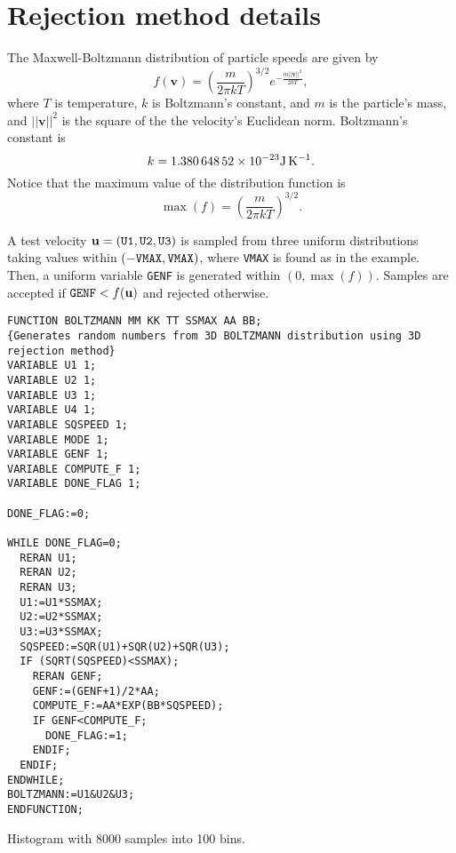 \documentclass[12pt]{article}
\begin{document}
\section*{Rejection method details}

The Maxwell-Boltzmann distribution of particle speeds are given by
\[f(\mathbf{v})=\left( \frac{m}{2\pi k T} \right)^{3/2} e^{-\frac{m||\mathbf{v}||^2}{2kT}},\]
where $T$ is temperature, $k$ is Boltzmann's constant, and $m$ is the particle's mass, and $||\mathbf{v}||^2$ is the square of the the velocity's Euclidean norm.  Boltzmann's constant is
\[k=\text{\num[exponent-product = \times]{1.38064852e-23}\SI{}{\joule\per\kelvin}}.\]
Notice that the maximum value of the distribution function is 
\[\max(f)=\left( \frac{m}{2\pi k T} \right)^{3/2}.\]

A test velocity $\mathbf{u}=(\text{\texttt{U1}},\text{\texttt{U2}},\text{\texttt{U3}})$ is sampled from three uniform distributions taking values within $(-\text{\texttt{VMAX}},\text{\texttt{VMAX}})$, where \texttt{VMAX} is found as in the example.  Then, a uniform variable \texttt{GENF} is generated within $(0,\max(f))$.  Samples are accepted if $\text{\texttt{GENF}}<f(\mathbf{u})$ and rejected otherwise.

\begin{lstlisting}
FUNCTION BOLTZMANN MM KK TT SSMAX AA BB;
{Generates random numbers from 3D BOLTZMANN distribution using 3D rejection method}
VARIABLE U1 1;
VARIABLE U2 1;
VARIABLE U3 1;
VARIABLE U4 1;
VARIABLE SQSPEED 1;
VARIABLE MODE 1;
VARIABLE GENF 1;
VARIABLE COMPUTE_F 1;
VARIABLE DONE_FLAG 1;

DONE_FLAG:=0;

WHILE DONE_FLAG=0;
  RERAN U1;
  RERAN U2;
  RERAN U3;
  U1:=U1*SSMAX;
  U2:=U2*SSMAX;
  U3:=U3*SSMAX;
  SQSPEED:=SQR(U1)+SQR(U2)+SQR(U3);
  IF (SQRT(SQSPEED)<SSMAX);
    RERAN GENF;
    GENF:=(GENF+1)/2*AA;
    COMPUTE_F:=AA*EXP(BB*SQSPEED);
    IF GENF<COMPUTE_F;
      DONE_FLAG:=1;
    ENDIF;
  ENDIF;
ENDWHILE;
BOLTZMANN:=U1&U2&U3;
ENDFUNCTION;
\end{lstlisting}
Histogram with 8000 samples into 100 bins.

\hspace*{\fill} 
\hspace*{\fill} 
\end{document}
